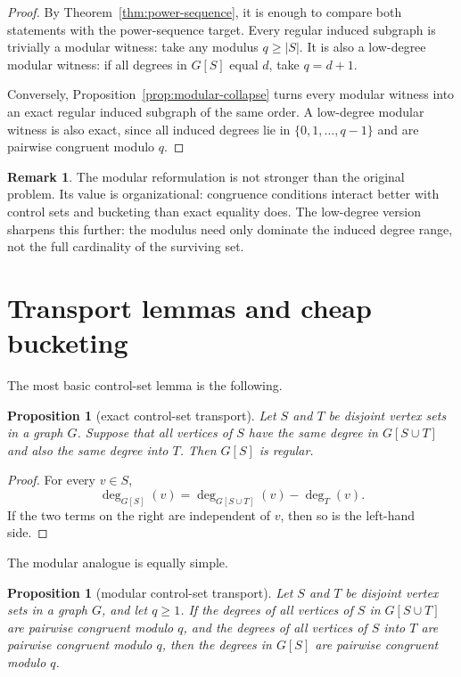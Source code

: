 \documentclass[11pt]{amsart}
\newtheorem{proposition}[theorem]{Proposition}
\theoremstyle{definition}
\newtheorem{remark}[theorem]{Remark}
\begin{document}
\begin{proof}
By Theorem~\ref{thm:power-sequence}, it is enough to compare both statements with the
power-sequence target. Every regular induced subgraph is trivially a modular witness: take any
modulus $q \ge |S|$. It is also a low-degree modular witness: if all degrees in $G[S]$ equal $d$,
take $q=d+1$.

Conversely, Proposition~\ref{prop:modular-collapse} turns every modular witness into an exact
regular induced subgraph of the same order. A low-degree modular witness is also exact, since all
induced degrees lie in $\{0,1,\dots,q-1\}$ and are pairwise congruent modulo $q$.
\end{proof}

\begin{remark}
The modular reformulation is not stronger than the original problem. Its value is organizational:
congruence conditions interact better with control sets and bucketing than exact equality does. The
low-degree version sharpens this further: the modulus need only dominate the induced degree range,
not the full cardinality of the surviving set.
\end{remark}

\section{Transport lemmas and cheap bucketing}\label{sec:transport}

The most basic control-set lemma is the following.

\begin{proposition}[exact control-set transport]\label{prop:exact-transport}
Let $S$ and $T$ be disjoint vertex sets in a graph $G$. Suppose that all vertices of $S$ have the
same degree in $G[S \cup T]$ and also the same degree into $T$. Then $G[S]$ is regular.
\end{proposition}

\begin{proof}
For every $v \in S$,
\[
  \deg_{G[S]}(v)=\deg_{G[S \cup T]}(v)-\deg_T(v).
\]
If the two terms on the right are independent of $v$, then so is the left-hand side.
\end{proof}

The modular analogue is equally simple.

\begin{proposition}[modular control-set transport]\label{prop:modular-transport}
Let $S$ and $T$ be disjoint vertex sets in a graph $G$, and let $q \ge 1$. If the degrees of all
vertices of $S$ in $G[S \cup T]$ are pairwise congruent modulo $q$, and the degrees of all
vertices of $S$ into $T$ are pairwise congruent modulo $q$, then the degrees in $G[S]$ are pairwise
congruent modulo $q$.
\end{proposition}
\end{document}
